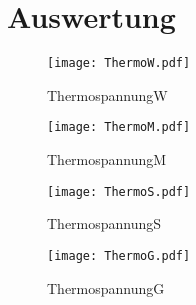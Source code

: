 \section{Auswertung}
\label{sec:Auswertung}

\begin{figure}
  \centering
  \texttt{[image: ThermoW.pdf]}
  \caption{ThermospannungW}
\end{figure}

\begin{figure}
  \centering
  \texttt{[image: ThermoM.pdf]}
  \caption{ThermospannungM}
\end{figure}

\begin{figure}
  \centering
  \texttt{[image: ThermoS.pdf]}
  \caption{ThermospannungS}
\end{figure}

\begin{figure}
  \centering
  \texttt{[image: ThermoG.pdf]}
  \caption{ThermospannungG}
\end{figure}
